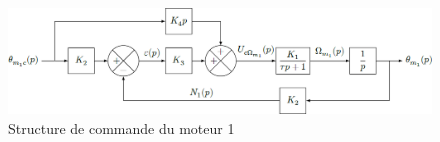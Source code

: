 \documentclass[10pt,fleqn]{article} %
\begin{document}
%
%
\begin{figure}[H]
\centering
\includegraphics[width=0.9\linewidth]{fig_08}
\caption{Structure de commande du moteur 1 \label{fig_08}}
\end{figure}
\end{document}
